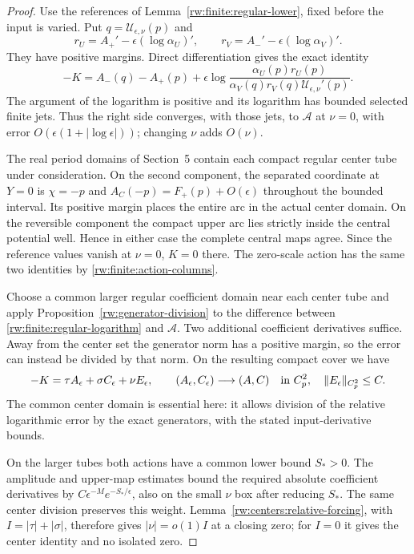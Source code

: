 \begin{proof}
Use the references of Lemma~\ref{rw:finite:regular-lower}, fixed
before the input is varied. Put $q=\mathcal U_{\epsilon,\nu}(p)$
and
\[
 r_U=A_+'-\epsilon(\log\alpha_U)',\qquad
 r_V=A_-'-\epsilon(\log\alpha_V)'.
\]
They have positive margins. Direct differentiation gives the exact
identity
\begin{equation}\label{rw:finite:regular-logarithm}
 -K=A_-(q)-A_+(p)
       +\epsilon\log\frac{\alpha_U(p)r_U(p)}
        {\alpha_V(q)r_V(q)\mathcal U_{\epsilon,\nu}'(p)}.
\end{equation}
The argument of the logarithm is positive and its logarithm has
bounded selected finite jets. Thus the right side converges, with
those jets, to $\mathcal A$ at $\nu=0$, with error
$O(\epsilon(1+|\log\epsilon|))$; changing $\nu$ adds $O(\nu)$.

The real period domains of Section~5 contain each compact regular
center tube under consideration. On the second component, the
separated coordinate at $Y=0$ is $\chi=-p$ and
$A_C(-p)=F_+(p)+O(\epsilon)$ throughout the bounded interval.
Its positive margin places the entire arc in the actual center
domain. On the reversible component the compact upper arc lies
strictly inside the central potential well. Hence in either case
the complete central maps agree. Since the reference values vanish
at $\nu=0$, $K=0$ there. The zero-scale action has the same two
identities by \eqref{rw:finite:action-columns}.

Choose a common larger regular coefficient domain near each
center tube and apply Proposition~\ref{rw:generator-division} to
the difference between \eqref{rw:finite:regular-logarithm} and
$\mathcal A$. Two additional coefficient derivatives suffice.
Away from the center set the generator norm has a positive margin,
so the error can instead be divided by that norm. On the resulting
compact cover we have
\begin{equation}\label{rw:finite:perturbed-columns}
 -K=\tau A_\epsilon+\sigma C_\epsilon+\nu E_\epsilon,
 \qquad (A_\epsilon,C_\epsilon)\longrightarrow(A,C)
                  \quad\hbox{in }C^2_p,
 \quad \|E_\epsilon\|_{C^2_p}\le C.
\end{equation}
The common center domain is essential here: it allows division of
the relative logarithmic error by the exact generators, with the
stated input-derivative bounds.

On the larger tubes both actions have a common lower bound $S_*>0$.
The amplitude and upper-map estimates bound the required absolute
coefficient derivatives by $C\epsilon^{-M}e^{-S_*/\epsilon}$,
also on the small $\nu$ box after reducing $S_*$. The same center
division preserves this weight. Lemma~\ref{rw:centers:relative-forcing},
with $I=|\tau|+|\sigma|$, therefore gives
$|\nu|=o(1)I$ at a closing zero; for $I=0$ it gives the center
identity and no isolated zero.


\end{proof}
